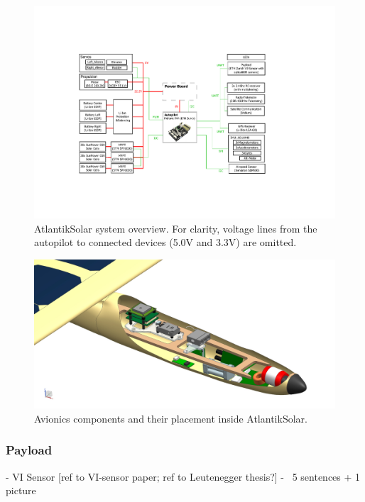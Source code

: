 \begin{figure}[tb]
    \centering
     \includegraphics[width=\linewidth]{images/8b_AtlantikSolar_Avionics}
    \caption{AtlantikSolar system overview. For clarity, voltage lines from the autopilot to connected devices (5.0V and 3.3V) are omitted.}
    \label{fig:AtlantikSolar_SystemOverview}
\end{figure}

\begin{figure}[tb]
    \centering
    \includegraphics[width=\linewidth]{images/9_CAD_AtlantikSolarAvionics}
    \caption{Avionics components and their placement inside AtlantikSolar.}
    \label{fig:9_CAD_AtlantikSolarAvionics}
\end{figure}

\subsubsection{Payload}
  - VI Sensor [ref to VI-sensor paper; ref to Leutenegger thesis?]
  - ~5 sentences + 1 picture
  
